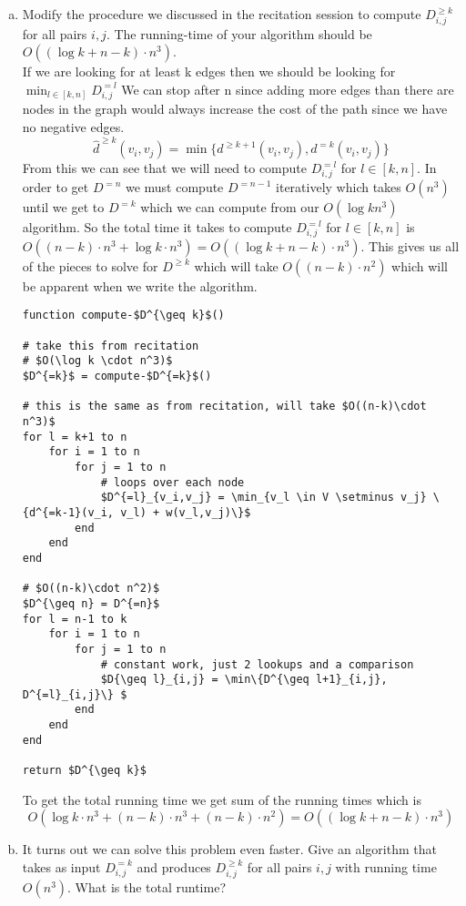 \documentclass{article}
\begin{document}
\begin{enumerate}[a)]
\item Modify the procedure we discussed in the recitation session to compute $D^{\geq k}_{i,j}$ for all pairs $i,j$.
The running-time of your algorithm should be $O((\log k + n - k)\cdot n^3)$.\\

If we are looking for at least k edges then we should be looking for $\min_{l \in [k,n]} D^{=l}_{i,j}$
We can stop after n since adding more edges than there are nodes in the graph would always increase the cost of the path since we have no negative edges.
$$\hat{d}^{\geq k}(v_i,v_j) = \min \{d^{\geq k+1}(v_i, v_j), d^{=k}(v_i, v_j)\}$$
From this we can see that we will need to compute $D^{=l}_{i,j}$ for $l \in [k, n]$.
In order to get $D^{=n}$ we must compute $D^{= n-1}$ iteratively which takes $O(n^3)$ until we get to $D^{=k}$ which we can compute from our $O(\log k n^3)$ algorithm.
So the total time it takes to compute $D^{=l}_{i,j}$ for $l \in [k, n]$ is $O((n-k)\cdot n^3 + \log k \cdot n^3) = O((\log k + n - k) \cdot n^3)$.
This gives us all of the pieces to solve for $D^{\geq k}$ which will take $O((n-k)\cdot n^2)$ which will be apparent when we write the algorithm.

\begin{lstlisting}
function compute-$D^{\geq k}$()

# take this from recitation
# $O(\log k \cdot n^3)$
$D^{=k}$ = compute-$D^{=k}$()

# this is the same as from recitation, will take $O((n-k)\cdot n^3)$
for l = k+1 to n
    for i = 1 to n
        for j = 1 to n
            # loops over each node
            $D^{=l}_{v_i,v_j} = \min_{v_l \in V \setminus v_j} \{d^{=k-1}(v_i, v_l) + w(v_l,v_j)\}$
        end
    end
end

# $O((n-k)\cdot n^2)$
$D^{\geq n} = D^{=n}$
for l = n-1 to k
    for i = 1 to n
        for j = 1 to n
            # constant work, just 2 lookups and a comparison
            $D{\geq l}_{i,j} = \min\{D^{\geq l+1}_{i,j}, D^{=l}_{i,j}\} $
        end
    end
end

return $D^{\geq k}$

\end{lstlisting}

To get the total running time we get sum of the running times which is
$$O( \log k \cdot n^3 +(n-k)\cdot n^3 + (n-k)\cdot n^2) = O((\log k + n -k) \cdot n^3)$$


\item It turns out we can solve this problem even faster. Give an algorithm that takes as input $D^{=k}_{i,j}$ and produces $D^{\geq k}_{i,j}$ for all pairs $i,j$ with running time $O(n^3)$.
What is the total runtime? \\


\end{enumerate}
\end{document}
